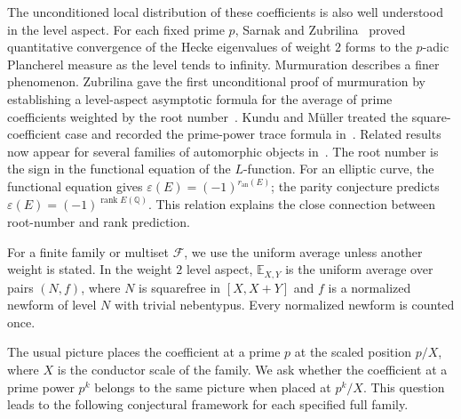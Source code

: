 \documentclass[12pt,reqno]{amsart}
\numberwithin{equation}{section}
\theoremstyle{plain}
\theoremstyle{definition}
\theoremstyle{remark}
\newcommand{\rank}{\operatorname{rank}}
\begin{document}
The unconditioned local distribution of these coefficients is also well understood in the level aspect.
For each fixed prime $p$, Sarnak and Zubrilina~\cite{SarnakZubrilina2024} proved quantitative
convergence of the Hecke eigenvalues of weight $2$ forms to the $p$-adic Plancherel measure as the level tends to infinity.
Murmuration describes a finer phenomenon.
Zubrilina gave the first unconditional proof of murmuration by establishing a level-aspect asymptotic formula for the average of prime coefficients weighted by the root number~\cite{Zubrilina2025}.
Kundu and M\"uller treated the square-coefficient case and recorded the prime-power trace formula in~\cite{KunduMuller2026}.
Related results now appear for several families of automorphic objects in~\cite{BBLLD2026,BLLDSHZ2024,Cowan2024,LeeOliverPozdnyakov2025,SawinSutherland2025}.
The root number is the sign in the functional equation of the $L$-function.
For an elliptic curve, the functional equation gives
$\varepsilon(E)=(-1)^{r_{\mathrm{an}}(E)}$; the parity conjecture predicts
$\varepsilon(E)=(-1)^{\rank E(\mathbb Q)}$.
This relation explains the close connection between root-number and rank prediction.

For a finite family or multiset $\mathcal F$, we use the uniform average unless another weight is stated.
In the weight $2$ level aspect, $\mathbb E_{X,Y}$ is the uniform average over pairs $(N,f)$, where $N$ is squarefree in $[X,X+Y]$ and $f$ is a normalized newform of level $N$ with trivial nebentypus.
Every normalized newform is counted once.

The usual picture places the coefficient at a prime $p$ at the scaled position $p/X$, where $X$ is the conductor scale of the family.
We ask whether the coefficient at a prime power $p^k$ belongs to the same picture when placed at $p^k/X$.
This question leads to the following conjectural framework for each specified full family.
\end{document}
